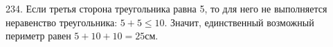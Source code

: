 234. Если третья сторона треугольника равна 5, то для него не выполняется неравенство треугольника: $5+5\leqslant10.$ Значит, единственный возможный периметр равен $5+10+10=25$см.\newpage\noindent
